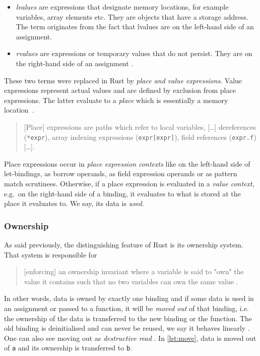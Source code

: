 \begin{itemize}
\tightlist
\item
  \emph{lvalues} are expressions that designate memory locations, for
  example variables, array elements etc. They are objects that have a
  storage address. The term originates from the fact that lvalues are on
  the left-hand side of an assignment.
\item
  \emph{rvalues} are expressions or temporary values that do not
  persist. They are on the right-hand side of an assignment \cite{wiki:lvalues}.
\end{itemize}

These two terms were replaced in Rust by \emph{place and value expressions}.
Value expressions represent actual values and are defined by exclusion from
place expressions. The latter evaluate to a \emph{place} which is essentially a
memory location~\cite{rustref}.

\begin{quote}
{[}Place{]} expressions are paths which refer to local variables,
{[}\ldots{]} dereferences (\passthrough{\lstinline!*expr!}), array
indexing expressions (\passthrough{\lstinline!expr[expr]!}), field
references (\passthrough{\lstinline!expr.f!}) {[}\ldots{]}. \\
\cite[section "Expressions"]{rustref}
\end{quote}

Place expressions occur in \emph{place expression contexts} like on the
left-hand side of let-bindings, as borrow operands, as field expression
operands or as pattern match scrutinees. Otherwise, if a place
expression is evaluated in a \emph{value context}, e.g.~on the
right-hand side of a binding, it evaluates to what is stored at the
place it evaluates to. We say, its data is \emph{used}.

\subsubsection{Ownership}

As said previously, the distinguishing feature of Rust is its ownership system.
That system is responsible for

\begin{quote}
{[enforcing]} an ownership invariant where a
variable is said to "own" the value it contains such that no two variables can
own the same value \cite[page 5]{lightweight-formalism}.
\end{quote}

In other words, data is owned by exactly one binding and if some data is used in
an assignment or passed to a function, it will be \emph{moved out} of that
binding, i.e. the ownership of the data is transferred to the new binding or the
function. The old binding is deinitialised and can never be reused, we say it
behaves linearly \cite{oxide}. One can also see moving out as \emph{destructive
read} \cite{islands-alias-protection}. In \autoref{lst:move}, data is moved out
of \passthrough{\lstinline!a!} and its ownership is transferred to
\passthrough{\lstinline!b!}.

